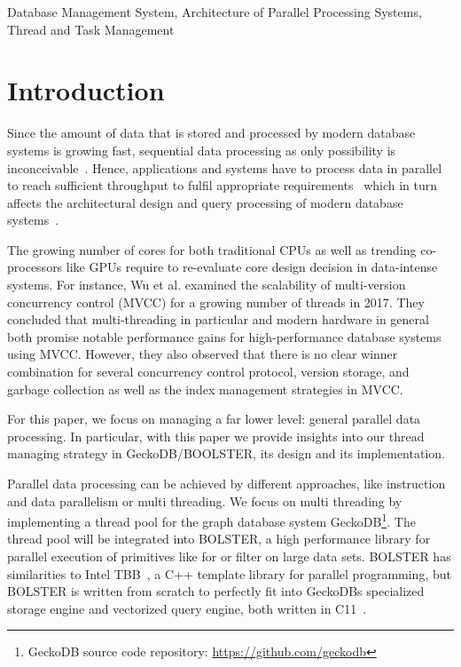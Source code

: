 \documentclass[conference]{IEEEtran}
\begin{document}
\begin{IEEEkeywords}
Database Management System, Architecture of Parallel Processing Systems, Thread and Task Management
\end{IEEEkeywords}

\section{Introduction}
Since the amount of data that is stored and processed by modern database systems is growing fast, sequential data processing as only possibility is inconceivable~\cite{Alonso:2013:HKS:2510649.2511162}. Hence, applications and systems have to process data in parallel to reach sufficient throughput to fulfil appropriate requirements~\cite{DBLP:series/synthesis/2017Ailamaki, 10.1007/978-3-319-72413-3_8, 10.5120/ijca2016912260} which in turn affects the architectural design and query processing of modern database systems~\cite{agrawal2017many, Makreshanski2017, schuh2016experimental, psaroudakis2016adaptive, psaroudakis2013task}. 

The growing number of cores for both traditional CPUs as well as trending co-processors like GPUs require to re-evaluate core design decision in data-intense systems. For instance, Wu et al. examined the scalability of multi-version concurrency control (MVCC) for a growing number of threads in  2017\cite{wu2017empirical}. They concluded that multi-threading in particular and modern hardware in general both promise notable performance gains for high-performance database systems using MVCC. However, they also observed that there is no clear winner combination for several concurrency control protocol, version storage, and garbage collection as well as the index management strategies in MVCC. 

For this paper, we focus on managing a far lower level: general parallel data processing. In particular, with this paper we provide insights into our thread managing strategy in GeckoDB/BOOLSTER, its design and its implementation. 

Parallel data processing can be achieved by different approaches, like instruction and data parallelism or multi threading. We focus on multi threading by implementing a thread pool for the graph database system GeckoDB\footnote{GeckoDB source code repository: \url{https://github.com/geckodb}}. The thread pool will be integrated into BOLSTER, a high performance library for parallel execution of primitives like for or filter on large data sets. BOLSTER has similarities to Intel TBB~\cite{books/daglib/0018624}, a C++ template library for parallel programming, but BOLSTER is written from scratch to perfectly fit into GeckoDBs specialized storage engine and vectorized query engine, both written in C11~\cite{pinneckegridtables}. 
\end{document}
